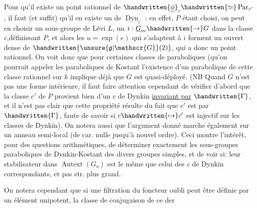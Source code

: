 Pour qu'il existe un point rationnel de  $\handwritten{\underline{\phi}}_c\handwritten{\simeq}\operatorname{Par}_{c'}$, il faut (et suffit) qu'il en existe un de $\operatorname{Dyn}_c$ : en effet, $P$ étant choisi,  on peut en choisir un  sous-groupe de Lévi $L$, un $i:\underline{G}_m\handwritten{\to}G$ dans la classe $c$,définissant $P$, et alors les $u=\exp(e)$ qui  s'adaptent à $i$ forment un ouvert dense de $\handwritten{\unsure{\mathfrak{g}|\mathscr{G}}(2)}$, qui  a donc un point rationnel. On voit donc que pour certaines classes de paraboliques (qu'on pourrait appeler les paraboliques de Kostant\unsure{)} l'existence d'un parabolique de cette classe rationnel sur $k$ implique déjà que $G$ est quasi-déployé. (NB Quand $G$ n'est pas une forme intérieure, il faut faire attention cependant de vérifier d'abord que la classe $c'$ de $P$ provient bien d'un $c$ de Dynkin \uline{invariant par} $\handwritten{\Gamma}$, et il n'est pas clair que cette propriété résulte du fait que $c'$ est  par $\handwritten{\Gamma}$, faute de savoir si $c\handwritten{\mapsto}c'$ est injectif sur les classes de Dynkin). \handwritten{(}On notera aussi que l'argument donné marche également sur un anneau semi-local (de car. nulle jusqu'à nouvel ordre).\handwritten{)}
Ceci montre l'intérêt, pour des questions arithmétiques, de déterminer exactement les sous-groupes parab\handwritten{\unsure{-}}oliques de Dynkin-Kostant des divers groupes simples, et de voir si: leur stabilisateur dans $\operatorname{Autext}(G_o)$ est le même que celui des $c$ de Dynkin correspondants, et pas str. plus grand.

On notera cependant que si une filtration du foncteur  oubli peut être définie par un élément unipotent, la classe de conjugaison de ce der%
